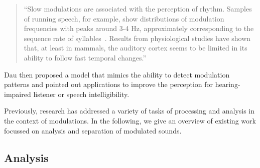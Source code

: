 \begin{quote}
``Slow modulations are associated with the perception of rhythm. Samples of running speech, for example, show distributions of modulation frequencies with peaks around 3-4 Hz, approximately corresponding to the sequence rate of syllables~\cite{plomp83}. Results from physiological studies have shown that, at least in mammals, the auditory cortex seems to be limited in its ability to follow fast temporal changes.''
\end{quote}

Dau then proposed a model that mimics the ability to detect modulation patterns and pointed out applications to improve the perception for hearing-impaired listener or speech intelligibility.
\par
Previously, research has addressed a variety of tasks of processing and analysis in the context of modulations.
In the following, we give an overview of existing work focussed on analysis and separation of modulated sounds.

\subsection{Analysis}

